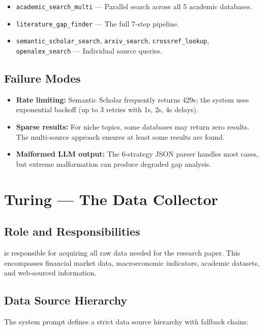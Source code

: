 \begin{itemize}
  \item \texttt{academic\_search\_multi} --- Parallel search across all 5 academic databases.
  \item \texttt{literature\_gap\_finder} --- The full 7-step pipeline.
  \item \texttt{semantic\_scholar\_search}, \texttt{arxiv\_search}, \texttt{crossref\_lookup}, \texttt{openalex\_search} --- Individual source queries.
\end{itemize}

\subsection{Failure Modes}

\begin{itemize}
  \item \textbf{Rate limiting:} Semantic Scholar frequently returns 429s; the system uses exponential backoff (up to 3 retries with 1s, 2s, 4s delays).
  \item \textbf{Sparse results:} For niche topics, some databases may return zero results. The multi-source approach ensures at least some results are found.
  \item \textbf{Malformed LLM output:} The 6-strategy JSON parser handles most cases, but extreme malformation can produce degraded gap analysis.
\end{itemize}

\section{Turing --- The Data Collector}
\label{sec:agents:turing}

\subsection{Role and Responsibilities}

\turing is responsible for acquiring all raw data needed for the research paper.
This encompasses financial market data, macroeconomic indicators, academic datasets, and web-sourced information.

\subsection{Data Source Hierarchy}

The system prompt defines a strict data source hierarchy with fallback chains:

